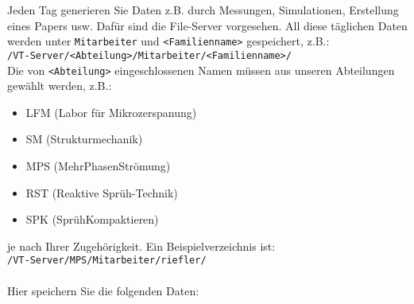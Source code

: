 Jeden Tag generieren Sie Daten z.B. durch Messungen, Simulationen, Erstellung
eines Papers usw. Dafür sind die File-Server vorgesehen. All diese täglichen
Daten werden unter \texttt{Mitarbeiter} und \texttt{<Familienname>} gespeichert,
z.B.: \\
\texttt{/VT-Server/<Abteilung>/Mitarbeiter/<Familienname>/} \\
Die von \texttt{<Abteilung>} eingeschlossenen Namen müssen aus unseren
Abteilungen gewählt werden, z.B.:
\begin{itemize}
  \item LFM (Labor für Mikrozerspanung)
  \item SM (Strukturmechanik)
  \item MPS (MehrPhasenStrömung)
  \item RST (Reaktive Sprüh-Technik)
  \item SPK (SprühKompaktieren)
\end{itemize}
je nach Ihrer Zugehörigkeit. Ein Beispielverzeichnis ist: \\
\texttt{/VT-Server/MPS/Mitarbeiter/riefler/} \\
\\
Hier speichern Sie die folgenden Daten:
